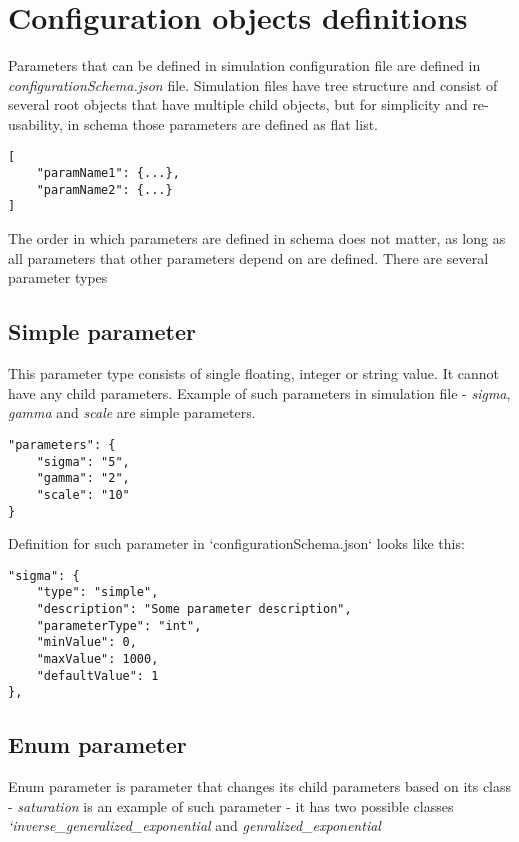 \chapter{Configuration objects definitions}
\label{appendix:A}
Parameters that can be defined in simulation configuration file are defined in \textit{configurationSchema.json} file. Simulation files have tree structure and consist of several root objects that have multiple child objects, but for simplicity and re-usability, in schema those parameters are defined as flat list.

\begin{lstlisting}[label=list:param-def,caption=Parameter definitions in schema, basicstyle=\footnotesize\ttfamily]
[
    "paramName1": {...},
    "paramName2": {...}
]
\end{lstlisting}

The order in which parameters are defined in schema does not matter, as long as all parameters that other parameters depend on are defined. There are several parameter types
\section{Simple parameter}
This parameter type consists of single floating, integer or string value. It cannot have any child parameters. Example of such parameters in simulation file - \textit{sigma}, \textit{gamma} and \textit{scale} are simple parameters.
\begin{lstlisting}[label=list:simple-param,caption=Simple parameter definition, basicstyle=\footnotesize\ttfamily]
"parameters": {
    "sigma": "5",
    "gamma": "2",
    "scale": "10"
}
\end{lstlisting}
Definition for such parameter in `configurationSchema.json` looks like this:
\begin{lstlisting}[label=list:simple-param-def,caption=Simple parameter definition, basicstyle=\footnotesize\ttfamily]
"sigma": {
    "type": "simple",
    "description": "Some parameter description",
    "parameterType": "int",
    "minValue": 0,
    "maxValue": 1000,
    "defaultValue": 1
},
\end{lstlisting}

\section{Enum parameter}
Enum parameter is parameter that changes its child parameters based on its class - \textit{saturation} is an example of such parameter - it has two possible classes \textit{`inverse\_generalized\_exponential} and \textit{genralized\_exponential}

